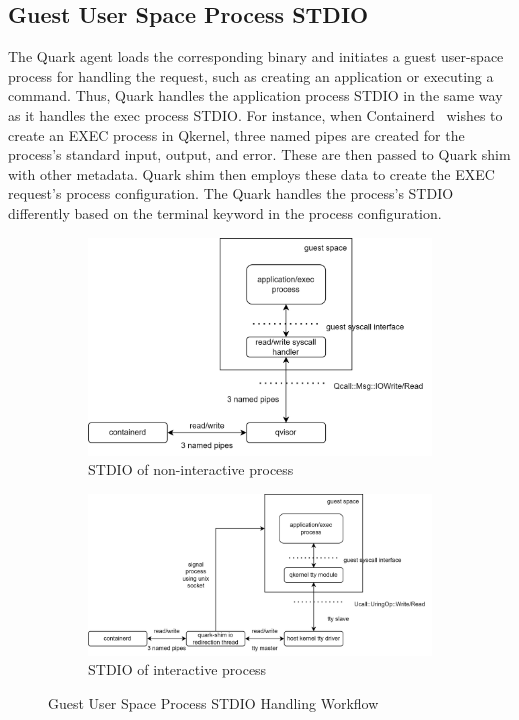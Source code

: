 \subsection{Guest User Space Process STDIO}
\label{sec:security_analyse_STDIO}

The Quark agent loads the corresponding binary and initiates a guest user-space process for handling the request, such as creating an application or executing a command. Thus, Quark handles the application process STDIO in the same way as it handles the exec process STDIO. For instance, when Containerd~\cite*{containerd} wishes to create an EXEC process in Qkernel, 
three named pipes are created for the process's standard input, output, and error. These are then passed to Quark shim with other metadata. Quark shim then employs these data to create the EXEC request's process configuration. The Quark handles the process's STDIO differently based on the terminal keyword in the process configuration.


\begin{figure}[ht] 
    \begin{subfigure}[b]{0.5\linewidth}
      \centering
      \includegraphics[width=0.9\linewidth]{images/normorl_io.png} 
      \caption{STDIO of non-interactive process} 
      \label{fig1:a} 
      \vspace{4ex}
    \end{subfigure}%
    \begin{subfigure}[b]{0.5\linewidth}
      \centering
      \includegraphics[width=0.9\linewidth]{images/termianl_workflow.png} 
      \caption{STDIO of interactive process} 
      \label{fig1:b} 
      \vspace{4ex}
    \end{subfigure} 
    \caption{Guest User Space Process STDIO Handling Workflow}
    \label{fig1} 
\end{figure}


